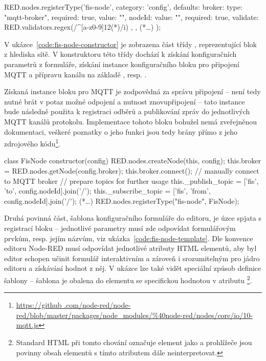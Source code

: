 \begin{code}[
    language=Javascript,
    label=code:fis-node-editor,
    caption={Registrace vlastního bloku do editoru sítě v nástroji Node-RED.}
]
RED.nodes.registerType('fis-node', {
    category: 'config',
    defaults: {
        broker: {type: "mqtt-broker", required: true, value: ""},
        nodeId: {
            value: "", required: true,
            validate: RED.validators.regex(/^[a-z0-9]{12}(*\textdollar*)/i)
        },
    },
    (*\ldots*)
});
\end{code}

V ukázce~\ref{code:fis-node-constructor} je zobrazena část třídy , reprezentující blok z hlediska sítě. V
konstruktoru této třídy dochází k získání konfiguračních
parametrů z formuláře, získání instance konfiguračního bloku pro připojení MQTT a přípravu kanálu na základě
, resp. .

Získaná instance bloku pro MQTT je zodpovědná za správu připojení -- není tedy nutné brát v potaz možné odpojení a
nutnost znovupřipojení -- tato instance bude následně použita k registraci odběrů a publikování zpráv do jednotlivých
MQTT kanálů protokolu.
Implementace tohoto bloku bohužel nemá zveřejněnou dokumentaci, veškeré poznatky o jeho funkci jsou tedy brány přímo
z jeho zdrojového kódu\footnote{\url{https://github
.com/node-red/node-red/blob/master/packages/node_modules/\%40node-red/nodes/core/io/10-mqtt.js}}.

\begin{code}[
    language=Javascript,
    numbers=left,
    label=code:fis-node-constructor,
    caption={Část konstruktoru třídy \ic{FisNode} obluhující připojení brokeru MQTT a přípravu kanálů pro komunikaci.}
]
class FisNode {
    constructor(config) {
        RED.nodes.createNode(this, config);
        this.broker = RED.nodes.getNode(config.broker);
        this.broker.connect(); // manually connect to MQTT broker
        // prepare topics for further usage
        this._publish_topic = ['fis', 'to', config.nodeId].join('/');
        this._subscribe_topic = ['fis', 'from', config.nodeId].join('/');
    }
    (*\ldots*)
    RED.nodes.registerType("fis-node", FisNode);
}
\end{code}

Druhá povinná část, šablona konfiguračního formuláře do editoru, je úzce spjata s registrací bloku -- jednotlivé
parametry musí zde odpovídat formulářovým prvkům, resp. jejím názvům, viz ukázka~\ref{code:fis-node-template}.
Dle konvence editoru Node-RED musí odpovídat jednotlivé atributy HTML elementů, aby byl editor schopen učinit
formulář interaktivním a zároveň i srozumitelným pro jádro editoru a získávání hodnot z něj.
V ukázce lze také vidět speciální způsob definice šablony -- šablona je obalena do elementu  se
specifickou hodnotou v atributu \footnote{Standard HTML při tomto chování označuje
element  jako  a prohlížeče jsou povinny obsah elementů s tímto atributem dále
neinterpretovat.}.

